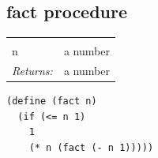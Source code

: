 \documentclass[twoside,9pt]{report}
\begin{document}
\subsection{fact procedure}
\label{fact-procedure}
\noindent\begin{tabular}{ |p{1.9cm} p{8cm}| }
\hline
\rowcolor[HTML]{CCCCCC} \multicolumn{2}{|l|}{\bf fact (public)} \\
n & a number \\
\textit{Returns:} & a number \\
\hline
\end{tabular}
\begin{lstlisting}
(define (fact n)
  (if (<= n 1)
    1
    (* n (fact (- n 1)))))
\end{lstlisting}

\printindex
\end{document}
